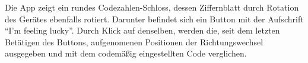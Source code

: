 Die App zeigt ein rundes Codezahlen-Schloss, dessen Ziffernblatt durch Rotation des Gerätes ebenfalls rotiert. Darunter befindet sich ein Button mit der Aufschrift \enquote{I'm feeling lucky}. Durch Klick auf denselben, werden die, seit dem letzten Betätigen des Buttons, aufgenomenen Positionen der Richtungswechsel ausgegeben und mit dem codemäßig eingestellten Code verglichen.
